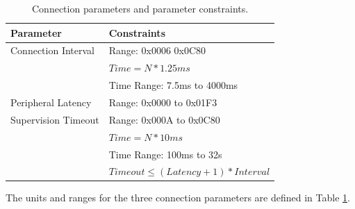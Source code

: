 \begin{table}
    \begin{center}
    \begin{tabular}{|l|l|}
        \hline
        \textbf{Parameter} & \textbf{Constraints} \\
        \hline
        Connection Interval & Range: 0x0006 0x0C80 \\
                            & $Time = N * 1.25ms$ \\
                            & Time Range: 7.5ms to 4000ms \\
        \hline
        Peripheral Latency  & Range: 0x0000 to 0x01F3 \\
        \hline
        Supervision Timeout & Range: 0x000A to 0x0C80 \\
                            & $Time = N * 10ms$ \\
                            & Time Range: 100ms to 32s \\
                            & $Timeout \leq (Latency + 1) * Interval$ \\
        \hline
    \end{tabular}
    \end{center}
    \caption{Connection parameters and parameter constraints.}
    \label{tbl:conn_params}
\end{table}

The units and ranges for the three connection parameters are defined in Table \ref{tbl:conn_params}.

